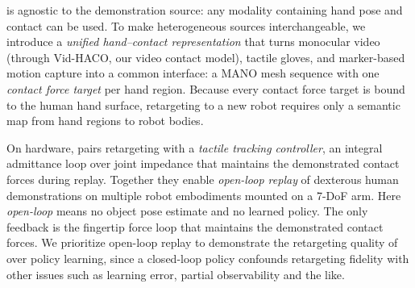 

\ours is agnostic to the demonstration source: any modality containing hand pose and contact can be used. To make heterogeneous sources interchangeable, we introduce a \emph{unified hand--contact representation} that turns monocular video (through Vid-HACO, our video contact model), tactile gloves, and marker-based motion capture into a common interface: a MANO mesh sequence with one \emph{contact force target} per hand region. Because every contact force target is bound to the human hand surface, retargeting to a new robot requires only a semantic map from hand regions to robot bodies.

On hardware, \ours pairs retargeting with a \emph{tactile tracking controller}, an integral admittance loop over joint impedance that maintains the demonstrated contact forces during replay. Together they enable \emph{open-loop replay} of dexterous human demonstrations on multiple robot embodiments mounted on a 7-DoF arm. Here \emph{open-loop} means no object pose estimate and no learned policy. The only feedback is the fingertip force loop that maintains the demonstrated contact forces. We prioritize open-loop replay to demonstrate the retargeting quality of \ours over policy learning, since a closed-loop policy confounds retargeting fidelity with other issues such as learning error, partial observability and the like. %


